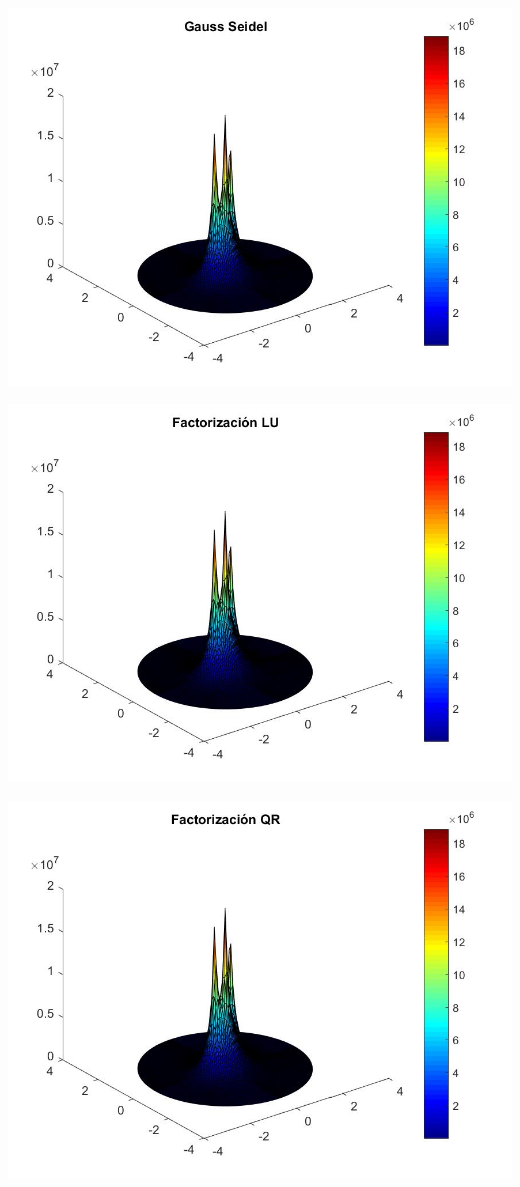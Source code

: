 \documentclass{memoria}
\begin{document}
{\includegraphics[width=16cm]{imagenes/SE/Resultados4225_GS.jpg}}

{\includegraphics[width=16cm]{imagenes/SE/Resultados4225_LU.jpg}}

{\includegraphics[width=16cm]{imagenes/SE/Resultados4225_QR.jpg}}
\end{document}
